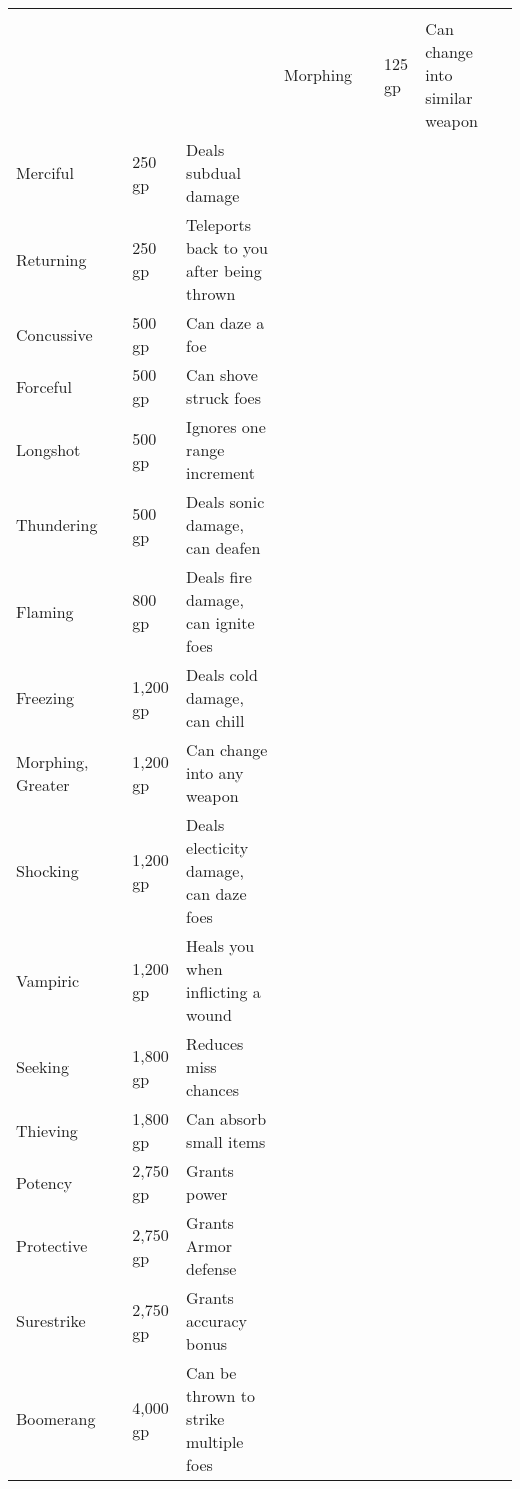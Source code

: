 
\begin{longtabuwrapper}
\begin{longtabu}{l l l X l}
 \\
 &  &  &  &  \tableheaderrule
Morphing &  & 125 gp & Can change into similar weapon & \pageref{item:Morphing} \\
Merciful &  & 250 gp & Deals subdual damage & \pageref{item:Merciful} \\
Returning &  & 250 gp & Teleports back to you after being thrown & \pageref{item:Returning} \\
Concussive &  & 500 gp & Can daze a foe & \pageref{item:Concussive} \\
Forceful &  & 500 gp & Can shove struck foes & \pageref{item:Forceful} \\
Longshot &  & 500 gp & Ignores one range increment & \pageref{item:Longshot} \\
Thundering &  & 500 gp & Deals sonic damage, can deafen & \pageref{item:Thundering} \\
Flaming &  & 800 gp & Deals fire damage, can ignite foes & \pageref{item:Flaming} \\
Freezing &  & 1,200 gp & Deals cold damage, can chill & \pageref{item:Freezing} \\
Morphing, Greater &  & 1,200 gp & Can change into any weapon & \pageref{item:Morphing, Greater} \\
Shocking &  & 1,200 gp & Deals electicity damage, can daze foes & \pageref{item:Shocking} \\
Vampiric &  & 1,200 gp & Heals you when inflicting a wound & \pageref{item:Vampiric} \\
Seeking &  & 1,800 gp & Reduces miss chances & \pageref{item:Seeking} \\
Thieving &  & 1,800 gp & Can absorb small items & \pageref{item:Thieving} \\
Potency &  & 2,750 gp & Grants  power & \pageref{item:Potency} \\
Protective &  & 2,750 gp & Grants  Armor defense & \pageref{item:Protective} \\
Surestrike &  & 2,750 gp & Grants  accuracy bonus & \pageref{item:Surestrike} \\
Boomerang &  & 4,000 gp & Can be thrown to strike multiple foes & \pageref{item:Boomerang} \\

\end{longtabu}
\end{longtabuwrapper}
